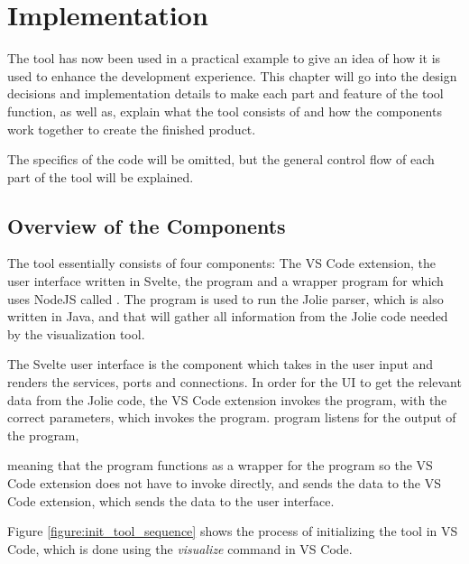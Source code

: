 \chapter{Implementation}
The tool has now been used in a practical example to give an idea of how it is used to enhance the development experience.
This chapter will go into the design decisions and implementation details to make each part and feature of the tool function, as well as,
explain what the tool consists of and how the components work together to create the finished product.

The specifics of the code will be omitted, but the general control flow of each part of the tool will be explained.

\section{Overview of the Components}
The tool essentially consists of four components: The VS Code extension, the user interface written in Svelte, the \javatoolname[] program and a wrapper program for \javatoolname[] which uses NodeJS called \nodetoolname[].
The \javatoolname[] program is used to run the Jolie parser, which is also written in Java, and that will gather all information from the Jolie code needed by the visualization tool.

The Svelte user interface is the component which takes in the user input and renders the services, ports and connections.
In order for the UI to get the relevant data from the Jolie code, the VS Code extension invokes the \nodetoolname[] program, with the correct parameters, which invokes the \javatoolname[] program.
\nodetoolname[] program listens for the output of the \javatoolname[] program,

meaning that the \nodetoolname[] program functions as a wrapper for the \javatoolname[] program so the VS Code extension does not have to invoke \javatoolname[] directly,
and sends the data to the VS Code extension, which sends the data to the user interface.

Figure \ref*{figure:init_tool_sequence} shows the process of initializing the tool in VS Code, which is done using the \textit{visualize} command in VS Code.

